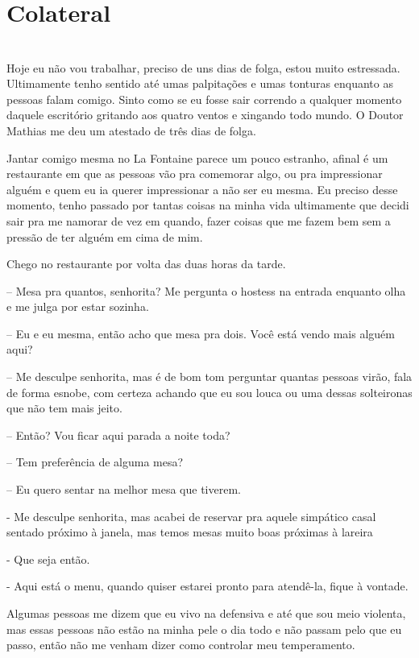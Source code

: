 
\newpage


\ifdefined\useChapters
\chapter{Colateral}
\else
\chapter{}
\fi
Hoje eu não vou trabalhar, preciso de uns dias de folga, estou muito estressada. Ultimamente tenho sentido até umas palpitações e umas tonturas enquanto as pessoas falam comigo. Sinto como se eu fosse sair correndo a qualquer momento daquele escritório gritando aos quatro ventos e xingando todo mundo. O Doutor Mathias me deu um atestado de três dias de folga.  

Jantar comigo mesma no La Fontaine parece um pouco estranho, afinal é um restaurante em que as pessoas vão pra comemorar algo, ou pra impressionar alguém e quem eu ia querer impressionar a não ser eu mesma. Eu preciso desse momento, tenho passado por tantas coisas na minha vida ultimamente que decidi sair pra me namorar de vez em quando, fazer coisas que me fazem bem sem a pressão de ter alguém em cima de mim.

Chego no restaurante por volta das duas horas da tarde.

-- Mesa pra quantos, senhorita? Me pergunta o hostess na entrada enquanto olha e me julga por estar sozinha.

-- Eu e eu mesma, então acho que mesa pra dois. Você está vendo mais alguém aqui?

-- Me desculpe senhorita, mas é de bom tom perguntar quantas pessoas virão, fala de forma esnobe, com certeza achando que eu sou louca ou uma dessas solteironas que não tem mais jeito.

-- Então? Vou ficar aqui parada a noite toda?

-- Tem preferência de alguma mesa?

-- Eu quero sentar na melhor mesa que tiverem.

- Me desculpe senhorita, mas acabei de reservar pra aquele simpático casal sentado próximo à janela, mas temos mesas muito boas próximas à lareira

- Que seja então.

- Aqui está o menu, quando quiser estarei pronto para atendê-la, fique à vontade.

Algumas pessoas me dizem que eu vivo na defensiva e até que sou meio violenta, mas essas pessoas não estão na minha pele o dia todo e não passam pelo que eu passo, então não me venham dizer como controlar meu temperamento.

